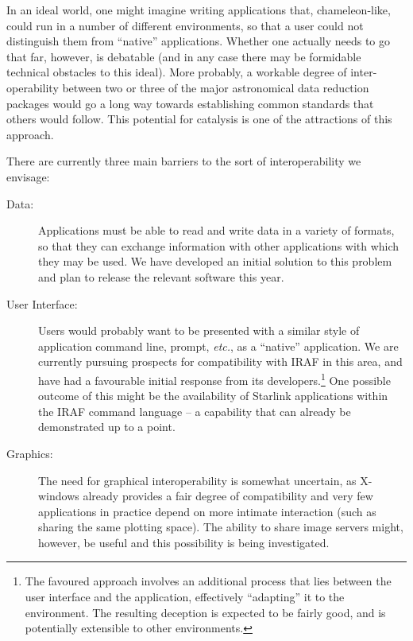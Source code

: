 \documentclass[twoside,11pt]{article}
\newcommand{\htmladdnormallink}[2]{#1}
\newcommand{\xref}[3]{#1}
\newcommand{\qt}[1]{``#1''}
\newcommand{\st}[1]{{\em{#1}}}
\newcommand{\qt}[1]{{\tt{"}}#1{\tt{"}}}
\newcommand{\irafurl}[0]{http://iraf.noao.edu/iraf-homepage.html}
\newcommand{\ndffmtref}[1]{\xref{#1}{ssn20}{}}
\newcommand{\irafref}[1]{\htmladdnormallink{#1}{\irafurl}}
\begin{document}
In an ideal world, one might imagine writing applications that,
chameleon-like, could run in a number of different environments, so
that a user could not distinguish them from \qt{native} applications.
Whether one actually needs to go that far, however, is debatable (and
in any case there may be formidable technical obstacles to this
ideal).  More probably, a workable degree of inter-operability between
two or three of the major astronomical data reduction packages would
go a long way towards establishing common standards that others would
follow. This potential for catalysis is one of the attractions of this
approach.

There are currently three main barriers to the sort of
interoperability we envisage:

\begin{description}
\item[Data:] Applications must be able to read and write data in a
variety of formats, so that they can exchange information with other
applications with which they may be used. We have developed an
\ndffmtref{initial solution} to this problem and plan to release the
relevant software this year.

\item[User Interface:] Users would probably want to be presented with
a similar style of application command line, prompt, \st{etc.}, as a
\qt{native} application.  We are currently pursuing prospects for
compatibility with \irafref{IRAF} in this area, and have had a
favourable initial response from its developers.\footnote{The favoured
approach involves an additional process that lies between the user
interface and the application, effectively \qt{adapting} it to the
environment. The resulting deception is expected to be fairly good,
and is potentially extensible to other environments.} One possible
outcome of this might be the availability of Starlink applications
within the IRAF command language -- a capability that can already be
demonstrated up to a point.

\item[Graphics:] The need for graphical interoperability is somewhat
uncertain, as X-windows already provides a fair degree of
compatibility and very few applications in practice depend on more
intimate interaction (such as sharing the same plotting space). The
ability to share image servers might, however, be useful and this
possibility is being investigated.

\end{description}
\end{document}

